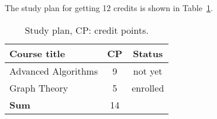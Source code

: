The study plan for getting 12 credits is shown in Table~\ref{tbl:study_plan}.
\begin{table}[!ht]
  \centering
  \begin{tabular}{l c c}
    \midrule
        \textbf{Course title} & \textbf{CP} & \textbf{Status}\\\midrule
    Advanced Algorithms & 9 & not yet \\\midrule
    Graph Theory & 5 &  enrolled \\\midrule
    \textbf{Sum} & 14\\
    \midrule
  \end{tabular}
\caption{Study plan, CP: credit points.}
  \label{tbl:study_plan}

\end{table}
